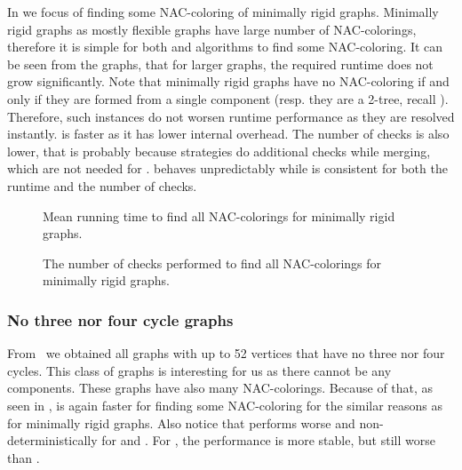 In 
we focus of finding some NAC-coloring of minimally rigid graphs.
%
Minimally rigid graphs as mostly flexible graphs have
large number of NAC-colorings, therefore it is simple for both \NaiveCycles{}
and \Subgraphs{} algorithms to find some NAC-coloring.
%
It can be seen from the graphs, that for larger graphs, the required runtime
does not grow significantly.
%
Note that minimally rigid graphs have no NAC-coloring if and only if they are formed from
a single \trcon{} component (resp. they are a 2-tree, recall ).
Therefore, such instances do not worsen runtime performance as they are resolved instantly.
%
\NaiveCycles{} is faster as it has lower internal overhead.
The number of \IsNACColoring{} checks is also lower,
that is probably because \Subgraphs{} strategies do additional checks
while merging, which are not needed for \NaiveCycles{}.
\SharedVertices{} behaves unpredictably while \MergeLinear{} is consistent
for both the runtime and the number of \IsNACColoring{} checks.

\begin{figure}[thbp]
	\centering
	\scalebox{\BenchFigureScale}{}
	\caption[Mean runtime for minimally rigid graphs (some)]{
		Mean running time to find all NAC-colorings for minimally rigid graphs.}%
	\label{fig:graph_minimally_rigid_first_runtime}
\end{figure}%
\begin{figure}[thbp]
	\centering
	\scalebox{\BenchFigureScale}{}
	\caption[Checks performed for minimally rigid graphs (some)]{
		The number of checks performed to find all NAC-colorings for minimally rigid graphs.}%
	\label{fig:graph_minimally_rigid_first_checks}
\end{figure}%



\subsubsection*{No three nor four cycle graphs}

From~\cite{extremal_graphs} we obtained all graphs with up to 52 vertices
that have no three nor four cycles. This class of graphs is interesting for us
as there cannot be any \trcon{} components.
These graphs have also many NAC-colorings.
Because of that, as seen in ,
\NaiveCycles{} is again faster for finding some NAC-coloring
for the similar reasons as for minimally rigid graphs.
%
Also notice that \SharedVertices{} performs worse and non-deterministically
for \CyclesMatchChunks{} and \None{}.
For \Neighbors{}, the performance is more stable, but still worse than \MergeLinear{}.

